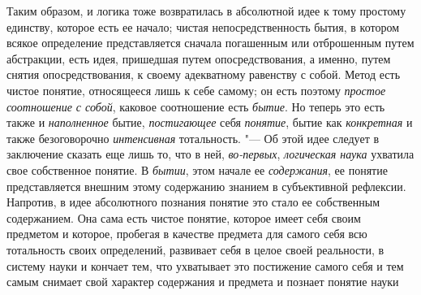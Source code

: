 {{Таким образом, и логика тоже возвратилась в абсолютной идее к
тому простому единству, которое есть ее начало; чистая непосредственность
бытия, в котором всякое определение представляется сначала погашенным или
отброшенным путем абстракции, есть идея, пришедшая путем опосредствования,
а именно, путем снятия опосредствования, к своему адекватному равенству с
собой. Метод есть чистое понятие, относящееся лишь к себе самому; он есть
поэтому {\em простое соотношение с собой}, каковое соотношение есть {\em
бытие}. Но теперь это есть также и {\em наполненное} бытие, {\em постигающее}
себя {\em понятие}, бытие как {\em конкретная} и также безоговорочно {\em
интенсивная} тотальность. "--- Об этой идее следует в заключение сказать еще
лишь то, что в ней, {\em во-первых}, {\em логическая наука }ухватила свое
собственное понятие. В {\em бытии}, этом начале ее {\em содержания}, ее
понятие представляется внешним этому содержанию знанием в субъективной
рефлексии. Напротив, в идее абсолютного познания понятие это стало ее
собственным содержанием. Она сама есть чистое понятие, которое имеет себя
своим предметом и которое, пробегая в качестве предмета для самого себя всю
тотальность своих определений, развивает себя в целое своей реальности, в
систему науки и кончает тем, что ухватывает это постижение самого себя и
тем самым снимает свой характер содержания и предмета и познает понятие
науки}}
